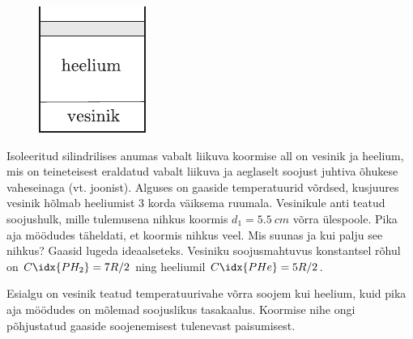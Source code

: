 
\begin{figure}
	\begin{center}
		\vspace{-20pt}
		\includegraphics[width=0.95\linewidth]{2007-v3g-06-yl}
	\end{center}
\end{figure}
Isoleeritud silindrilises anumas vabalt liikuva koormise all on vesinik ja heelium, mis on teineteisest eraldatud vabalt liikuva ja aeglaselt soojust juhtiva õhukese vaheseinaga (vt. joonist). Alguses on gaaside temperatuurid võrdsed, kusjuures vesinik hõlmab heeliumist 3 korda väiksema ruumala. Vesinikule anti teatud soojushulk, mille tulemusena nihkus koormis $d_1 = \SI{5,5}{cm}$ võrra ülespoole. Pika aja möödudes täheldati, et koormis nihkus veel. Mis suunas ja kui palju see nihkus? Gaasid lugeda ideaalseteks. Vesiniku soojusmahtuvus konstantsel rõhul on $C\idx{PH_2} = 7R/2$ ning heeliumil $C\idx{PHe} = 5R/2$.

\hint
Esialgu on vesinik teatud temperatuurivahe võrra soojem kui heelium, kuid pika aja möödudes on mõlemad soojuslikus tasakaalus. Koormise nihe ongi põhjustatud gaaside soojenemisest tulenevast paisumisest.

